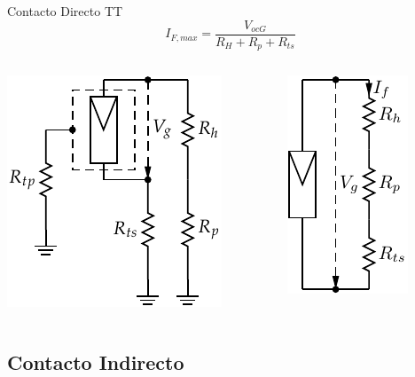 \documentclass[xcolor={usenames,svgnames,dvipsnames}]{beamer}
\begin{document}
\begin{frame}[label={sec:orge6dd398}]{Contacto Directo TT}
$$I_{F,max}=\frac{V_{ocG}}{R_{H}+R_{p}+R_{ts}}$$

\begin{columns}
\begin{column}{0.5\columnwidth}
\begin{center}
\includegraphics[height=0.5\textheight]{../figs/ContactoDirectoTT.pdf}
\end{center}
\end{column}

\begin{column}{0.5\columnwidth}
\begin{center}
\includegraphics[height=0.5\textheight]{../figs/ContactoDirectoTT_simple.pdf}
\end{center}
\end{column}
\end{columns}
\end{frame}




\subsection{Contacto Indirecto}
\label{sec:org2dd6939}
\end{document}
